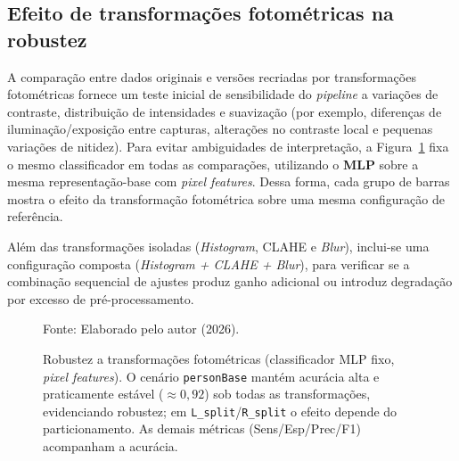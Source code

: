 \documentclass[11pt,a4paper]{article}
\begin{document}

\subsection{Efeito de transformações fotométricas na robustez}
A comparação entre dados originais e versões recriadas por transformações fotométricas fornece um teste inicial de sensibilidade do \textit{pipeline} a variações de contraste, distribuição de intensidades e suavização (por exemplo, diferenças de iluminação/exposição entre capturas, alterações no contraste local e pequenas variações de nitidez). Para evitar ambiguidades de interpretação, a Figura~\ref{fig:robustez} fixa o mesmo classificador em todas as comparações, utilizando o \textbf{MLP} sobre a mesma representação-base com \textit{pixel features}. Dessa forma, cada grupo de barras mostra o efeito da transformação fotométrica sobre uma mesma configuração de referência.

Além das transformações isoladas (\textit{Histogram}, CLAHE e \textit{Blur}), inclui-se uma configuração composta (\textit{Histogram + CLAHE + Blur}), para verificar se a combinação sequencial de ajustes produz ganho adicional ou introduz degradação por excesso de pré-processamento.

\begin{figure}[H]
\centering
{}
\caption{Robustez a transforma\c{c}\~oes fotom\'etricas (classificador MLP fixo, \textit{pixel features}). O cen\'ario \texttt{personBase} mant\'em acur\'acia alta e praticamente est\'avel ($\approx 0{,}92$) sob todas as transforma\c{c}\~oes, evidenciando robustez; em \texttt{L\_split}/\texttt{R\_split} o efeito depende do particionamento. As demais m\'etricas (Sens/Esp/Prec/F1) acompanham a acur\'acia.}
\label{fig:robustez}
{\footnotesize Fonte: Elaborado pelo autor (2026).}
\end{figure}
\end{document}
